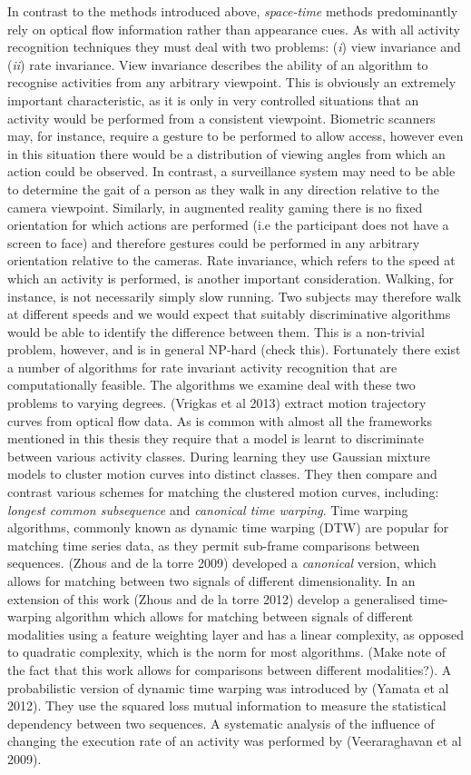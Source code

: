 In contrast to the methods introduced above, \textit{space-time} methods predominantly rely on optical flow information rather than appearance cues. As with all activity recognition techniques they must deal with two problems: (\textit{i}) view invariance and (\textit{ii}) rate invariance. View invariance describes the ability of an algorithm to recognise activities from any arbitrary viewpoint. This is obviously an extremely important characteristic, as it is only in very controlled situations that an activity would be performed from a consistent viewpoint. Biometric scanners may, for instance, require a gesture to be performed to allow access, however even in this situation there would be a distribution of viewing angles from which an action could be observed. In contrast, a surveillance system may need to be able to determine the gait of a person as they walk in any direction relative to the camera viewpoint. Similarly, in augmented reality gaming there is no fixed orientation for which actions are performed (i.e the participant does not have a screen to face) and therefore gestures could be performed in any arbitrary orientation relative to the cameras. Rate invariance, which refers to the speed at which an activity is performed, is another important consideration. Walking, for instance, is not necessarily simply slow running. Two subjects may therefore walk at different speeds and we would expect that suitably discriminative algorithms would be able to identify the difference between them. This is a non-trivial problem, however, and is in general NP-hard (check this). Fortunately there exist a number of algorithms for rate invariant activity recognition that are computationally feasible. The algorithms we examine deal with these two problems to varying degrees. (Vrigkas et al 2013) extract motion trajectory curves from optical flow data. As is common with almost all the frameworks mentioned in this thesis they require that a model is learnt to discriminate between various activity classes. During learning they use Gaussian mixture models to cluster motion curves into distinct classes. They then compare and contrast various schemes for matching the clustered motion curves, including: \textit{longest common subsequence} and \textit{canonical time warping}. Time warping algorithms, commonly known as dynamic time warping (DTW) are popular for matching time series data, as they permit sub-frame comparisons between sequences. (Zhous and de la torre 2009) developed a \textit{canonical} version, which allows for matching between two signals of different dimensionality. In an extension of this work (Zhous and de la torre 2012) develop a generalised time-warping algorithm which allows for matching between signals of different modalities using a feature weighting layer and has a linear complexity, as opposed to quadratic complexity, which is the norm for most algorithms. (Make note of the fact that this work allows for comparisons between different modalities?). A probabilistic version of dynamic time warping was introduced by (Yamata et al 2012). They use the squared loss mutual information to measure the statistical dependency between two sequences. A systematic analysis of the influence of changing the execution rate of an activity was performed by (Veeraraghavan et al 2009). 